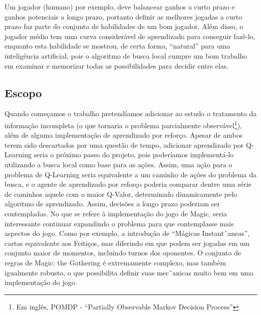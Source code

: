 Um jogador (humano) por exemplo, deve balancear ganhos a curto prazo e ganhos potenciais a longo prazo, portanto definir as melhores jogadas a curto prazo faz parte do conjunto de habilidades de um bom jogador. Além disso, o jogador médio tem uma curva considerável de aprendizado para conseguir fazê-lo, enquanto esta habilidade se mostrou, de certa forma, ``natural'' para uma inteligência artificial, pois o algoritmo de busca local cumpre um bom trabalho em examinar e memorizar todas as possibilidades para decidir entre elas.

\subsection{Escopo}
Quando começamos o trabalho pretendíamos adicionar ao estudo o tratamento da informação incompleta
(o que tornaria o problema parcialmente observável\footnote{Em inglês, POMDP - ``Partially Observable Markov Decision Process''}), além de alguma implementação de aprendizado por reforço. Apesar de ambos terem sido descartados por uma questão de tempo, adicionar aprendizado por Q-Learning seria o próximo passo do projeto, pois poderíamos implementá-lo utilizando a busca local como base para as ações. Assim, uma ação para o problema de Q-Learning seria equivalente a um caminho de ações do problema da busca, e o agente de aprendizado por reforço poderia comparar dentre uma série de caminhos aquele com o maior Q-Valor, determinado dinamicamente pelo algoritmo de aprendizado. Assim, decisões a longo prazo poderiam ser contempladas. No que se refere à implementação do jogo de Magic, seria interessante continuar expandindo o problema para que contemplasse mais aspectos do jogo. Como por exemplo, a introdução de ``Mágicas Instantˆaneas'', cartas equivalente aos Feitiços, mas diferindo em que podem ser jogadas em um conjunto maior de momentos, incluindo turnos dos oponentes. O conjunto de regras de Magic: the Gathering é extremamente complexo, mas também igualmente robusto, o que possibilita definir suas mecˆanicas muito bem em uma implementação do jogo.

